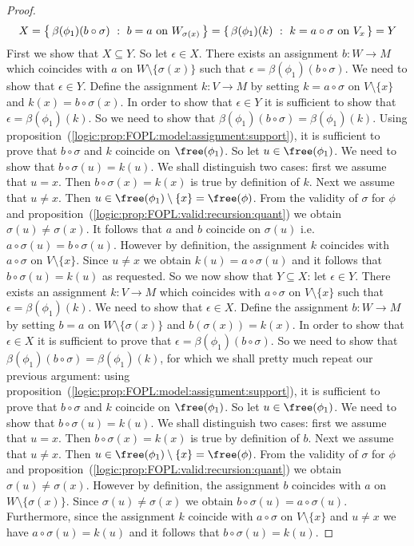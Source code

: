 \begin{proof}
    \[
    X=\left\{\,\beta(\phi_{1})(b\circ\sigma)\ :\ b=a\mbox{\ on\ }W_{\sigma(x)}\,\right\}
    = \left\{\,\beta(\phi_{1})(k)\ :\ k=a\circ\sigma\mbox{\ on\
    }V_{x}\,\right\}=Y
    \]
First we show that $X\subseteq Y$. So let $\epsilon\in X$. There
exists an assignment $b:W\to M$ which coincides with $a$ on
$W\setminus\{\sigma(x)\}$ such that
$\epsilon=\beta(\phi_{1})(b\circ\sigma)$. We need to show that
$\epsilon\in Y$. Define the assignment $k:V\to M$ by setting
$k=a\circ\sigma$ on $V\setminus\{x\}$ and $k(x)=b\circ\sigma(x)$. In
order to show that $\epsilon\in Y$ it is sufficient to show that
$\epsilon=\beta(\phi_{1})(k)$. So we need to show that
$\beta(\phi_{1})(b\circ\sigma)=\beta(\phi_{1})(k)$. Using
proposition~(\ref{logic:prop:FOPL:model:assignment:support}), it is
sufficient to prove that $b\circ\sigma$ and $k$ coincide on
$\free(\phi_{1})$. So let $u\in\free(\phi_{1})$. We need to show
that $b\circ\sigma(u)=k(u)$. We shall distinguish two cases: first
we assume that $u=x$. Then $b\circ\sigma(x)=k(x)$ is true by
definition of $k$. Next we assume that $u\neq x$. Then
$u\in\free(\phi_{1})\setminus\{x\}=\free(\phi)$. From the validity
of $\sigma$ for $\phi$ and
proposition~(\ref{logic:prop:FOPL:valid:recursion:quant}) we obtain
$\sigma(u)\neq\sigma(x)$. It follows that $a$ and $b$ coincide on
$\sigma(u)$ i.e. $a\circ\sigma(u)=b\circ\sigma(u)$. However by
definition, the assignment $k$ coincides with $a\circ\sigma$ on
$V\setminus\{x\}$. Since $u\neq x$ we obtain $k(u)=a\circ\sigma(u)$
and it follows that $b\circ\sigma(u)=k(u)$ as requested. So we now
show that $Y\subseteq X$: let $\epsilon\in Y$. There exists an
assignment $k:V\to M$ which coincides with $a\circ\sigma$ on
$V\setminus\{x\}$ such that $\epsilon=\beta(\phi_{1})(k)$. We need
to show that $\epsilon\in X$. Define the assignment $b:W\to M$ by
setting $b=a$ on $W\setminus\{\sigma(x)\}$ and $b(\sigma(x))=k(x)$.
In order to show that $\epsilon\in X$ it is sufficient to prove that
$\epsilon=\beta(\phi_{1})(b\circ\sigma)$. So we need to show that
$\beta(\phi_{1})(b\circ\sigma)=\beta(\phi_{1})(k)$, for which we
shall pretty much repeat our previous argument: using
proposition~(\ref{logic:prop:FOPL:model:assignment:support}), it is
sufficient to prove that $b\circ\sigma$ and $k$ coincide on
$\free(\phi_{1})$. So let $u\in\free(\phi_{1})$. We need to show
that $b\circ\sigma(u)=k(u)$. We shall distinguish two cases: first
we assume that $u=x$. Then $b\circ\sigma(x)=k(x)$ is true by
definition of $b$. Next we assume that $u\neq x$. Then
$u\in\free(\phi_{1})\setminus\{x\}=\free(\phi)$. From the validity
of $\sigma$ for $\phi$ and
proposition~(\ref{logic:prop:FOPL:valid:recursion:quant}) we obtain
$\sigma(u)\neq\sigma(x)$.  However by definition, the assignment $b$
coincides with $a$ on $W\setminus\{\sigma(x)\}$. Since
$\sigma(u)\neq\sigma(x)$ we obtain
$b\circ\sigma(u)=a\circ\sigma(u)$. Furthermore, since the assignment
$k$ coincide with $a\circ\sigma$ on $V\setminus\{x\}$ and $u\neq x$
we have $a\circ\sigma(u)=k(u)$ and it follows that
$b\circ\sigma(u)=k(u)$.
\end{proof}

